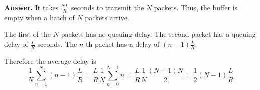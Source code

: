 
\textbf{Answer.}  It takes \(\frac{NL}{R}\) seconds to transmit the
\(N\) packets. Thus, the buffer is empty when a batch of \(N\) packets
arrive.

The first of the \(N\) packets has no queuing delay. The second packet
has a queuing delay of \(\frac{L}{R}\) seconds. The \(n\)-th packet
has a delay of \((n-1){\frac{L}{R}}\).

Therefore the average delay is \setlength\mathindent{-1pc}
\[
 {\frac{1}{N}}\sum_{n=1}^{N}(n-1){\frac{L}{R}} = \frac{L}{R}
 \frac{1}{N} \sum_{n=0}^{N-1}n = \frac{L}{R} \frac{1}{N}
 \frac{(N-1)N}{2} = \frac{1}{2} (N-1) \frac{L}{R}
\]
